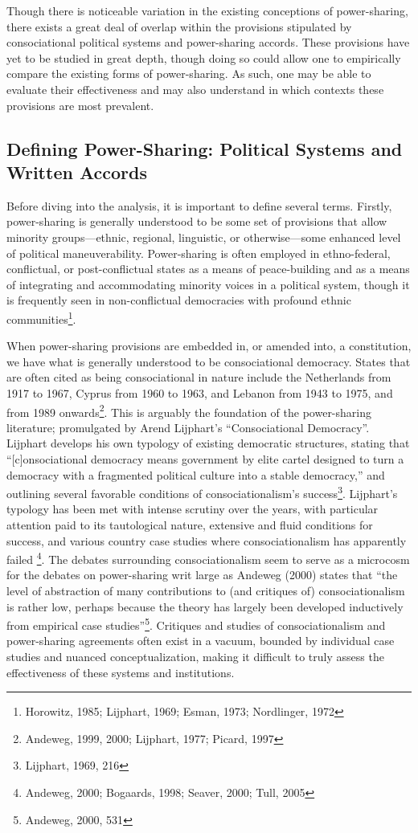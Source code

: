 \documentclass[12pt]{article}
\begin{document}
Though there is noticeable variation in the existing conceptions of power-sharing, there exists a great deal of overlap within the provisions stipulated by consociational political systems and power-sharing accords. These provisions have yet to be studied in great depth, though doing so could allow one to empirically compare the existing forms of power-sharing. As such, one may be able to evaluate their effectiveness and may also understand in which contexts these provisions are most prevalent. 

\subsection{Defining Power-Sharing: Political Systems and Written Accords} 
Before diving into the analysis, it is important to define several terms. Firstly, power-sharing is generally understood to be some set of provisions that allow minority groups—ethnic, regional, linguistic, or otherwise—some enhanced level of political maneuverability. Power-sharing is often employed in ethno-federal, conflictual, or post-conflictual states as a means of peace-building and as a means of integrating and accommodating minority voices in a political system, though it is frequently seen in non-conflictual democracies with profound ethnic communities\footnote{Horowitz, 1985; Lijphart, 1969; Esman, 1973; Nordlinger, 1972}.

When power-sharing provisions are embedded in, or amended into, a constitution, we have what is generally understood to be consociational democracy. States that are often cited as being consociational in nature include the Netherlands from 1917 to 1967, Cyprus from 1960 to 1963, and Lebanon from 1943 to 1975, and from 1989 onwards\footnote{Andeweg, 1999, 2000; Lijphart, 1977; Picard, 1997}. This is arguably the foundation of the power-sharing literature; promulgated by Arend Lijphart’s “Consociational Democracy”. Lijphart develops his own typology of existing democratic structures, stating that “[c]onsociational democracy means government by elite cartel designed to turn a democracy with a fragmented political culture into a stable democracy,” and outlining several favorable conditions of consociationalism’s success\footnote{Lijphart, 1969, 216}. Lijphart’s typology has been met with intense scrutiny over the years, with particular attention paid to its tautological nature, extensive and fluid conditions for success, and various country case studies where consociationalism has apparently failed \footnote{Andeweg, 2000; Bogaards, 1998; Seaver, 2000; Tull, 2005}. The debates surrounding consociationalism seem to serve as a 
microcosm for the debates on power-sharing writ large as Andeweg (2000) states that “the level of abstraction of many contributions to (and critiques of) consociationalism is rather low, perhaps because the theory has largely been developed inductively from empirical case studies”\footnote{Andeweg, 2000, 531}. Critiques and studies of consociationalism and power-sharing agreements often exist in a vacuum, bounded by individual case studies and nuanced conceptualization, making it difficult to truly assess the effectiveness of these systems and institutions.    
\end{document}
